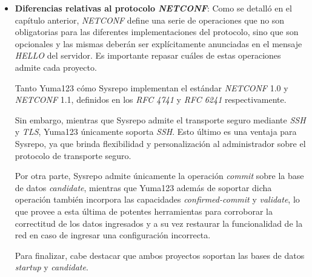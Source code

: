 \begin{itemize}
	\item \textbf{Diferencias relativas al protocolo \textit{NETCONF}}: Como se detalló en el capítulo anterior, \textit{NETCONF} define una serie de operaciones que no son obligatorias para las diferentes implementaciones del protocolo, sino que son opcionales y las mismas deberán ser explícitamente anunciadas en el mensaje \textit{HELLO} del servidor. Es importante repasar cuáles de estas operaciones admite cada proyecto. 
		
	Tanto Yuma123 \parencite{yuma123features} cómo Sysrepo \parencite{sysrepogit} implementan el estándar \textit{NETCONF} 1.0 y \textit{NETCONF} 1.1, definidos en los \textit{RFC 4741} \parencite{netconfrfc} y \textit{RFC 6241} \parencite{netconfrfcnuevo} respectivamente. 
	
	Sin embargo, mientras que Sysrepo admite el transporte seguro mediante \textit{SSH} y \textit{TLS}, Yuma123 únicamente soporta \textit{SSH}. Esto último es una ventaja para Sysrepo, ya que brinda flexibilidad y personalización al administrador sobre el protocolo de transporte seguro.
	
	Por otra parte, Sysrepo admite únicamente la operación \textit{commit} sobre la base de datos \textit{candidate}, mientras que Yuma123 además de soportar dicha operación también incorpora las capacidades \textit{confirmed-commit} y \textit{validate}, lo que provee a esta última de potentes herramientas para corroborar la correctitud de los datos ingresados y a su vez restaurar la funcionalidad de la red en caso de ingresar una configuración incorrecta.
	
	Para finalizar, cabe destacar que ambos proyectos soportan las bases de datos \textit{startup} y \textit{candidate}.


\end{itemize}
